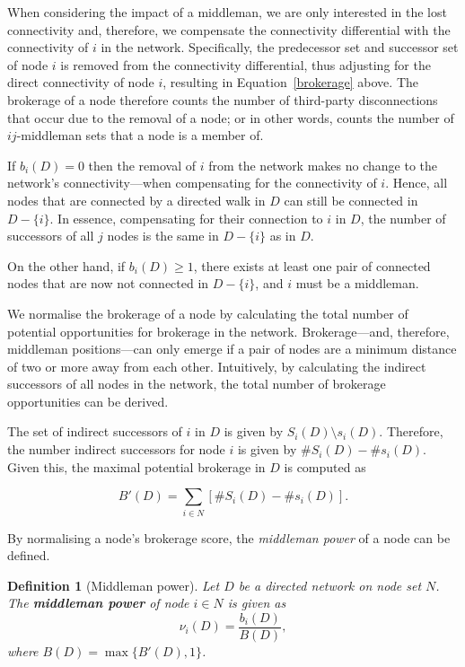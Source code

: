 \documentclass[11pt,fleqn]{article}
\newtheorem{definition}[theorem]{Definition}
\begin{document}
When considering the impact of a middleman, we are only interested in the lost connectivity and, therefore, we compensate the connectivity differential with the connectivity of $i$ in the network. Specifically, the predecessor set and successor set of node $i$ is removed from the connectivity differential, thus adjusting for the direct connectivity of node $i$, resulting in Equation~\ref{brokerage} above. The brokerage of a node therefore counts the number of third-party disconnections that occur due to the removal of a node; or in other words, counts the number of $ij$-middleman sets that a node is a member of.

If $b_{i}(D) = 0$ then the removal of $i$ from the network makes no change to the network's connectivity---when compensating for the connectivity of $i$. Hence, all nodes that are connected by a directed walk in $D$ can still be connected in $D - \{i\}$. In essence, compensating for their connection to $i$ in $D$, the number of successors of all $j$ nodes is the same in $D - \{i\}$ as in $D$.

On the other hand, if $b_{i}(D) \geqslant 1$, there exists at least one pair of connected nodes that are now not connected in $D - \{i\}$, and $i$ must be a middleman.

\medskip\noindent We normalise the brokerage of a node by calculating the total number of potential opportunities for brokerage in the network. Brokerage---and, therefore, middleman positions---can only emerge if a pair of nodes are a minimum distance of two or more away from each other. Intuitively, by calculating the indirect successors of all nodes in the network, the total number of brokerage opportunities can be derived.

The set of indirect successors of $i$ in $D$ is given by $S_{i}(D) \setminus s_{i}(D)$. Therefore, the number indirect successors for node $i$ is given by $\# S_{i}(D) - \# s_{i}(D)$. Given this, the maximal potential brokerage in $D$ is computed as

\begin{equation} \label{normalisation}
B'(D) = \sum_{i \in N} \left[ \# S_{i}(D) - \# s_{i}(D) \right] .
\end{equation}

By normalising a node's brokerage score, the \emph{middleman power} of a node can be defined.

\begin{definition}[Middleman power] \label{middlemanpower}
Let $D$ be a directed network on node set $N$. The \textbf{middleman power} of node $i \in N$ is given as
\begin{equation} \label{mmpowerindex}
\nu_{i}(D) = \frac{b_{i}(D)}{B(D)} ,
\end{equation}
where $B(D) = \max \{ B'(D) , 1\}$.
\end{definition}
\end{document}
